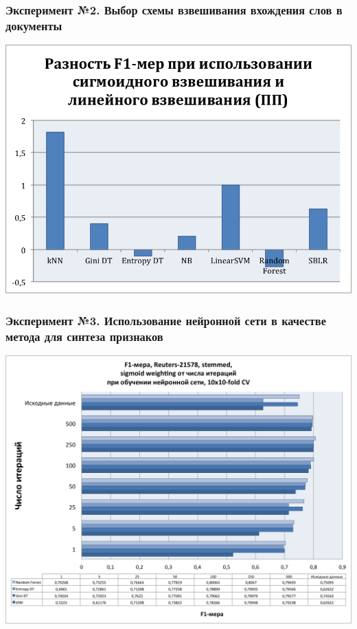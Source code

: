 \documentclass{beamer}
\begin{document}
\begin{frame}
\frametitle{Эксперимент №2. Выбор схемы взвешивания вхождения слов в документы}
\begin{center}
    \includegraphics[width=\linewidth,height=0.7\textheight,align=\center,trim=4 4 4 4, clip, keepaspectratio]{lin-sigm-diff.png}
\end{center}
\end{frame}

\begin{frame}
\frametitle{Эксперимент №3. Использование нейронной сети в качестве метода для синтеза признаков}
\begin{center}
    \includegraphics[width=\linewidth,height=0.8\textheight,align=\center,trim=4 4 4 4, clip, keepaspectratio]{neural-reuters.png}
\end{center}
\end{frame}
\end{document}
